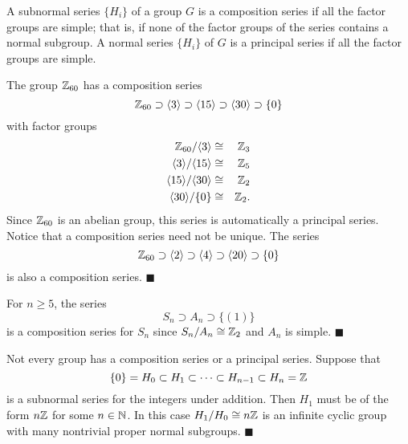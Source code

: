 
\vspace{2ex}
 
 
A subnormal series $\{ H_i \}$ of a group $G$ is a {\bfi composition
series\/} if all the factor groups are 
simple; that is, if none of the factor groups of the series contains a
normal subgroup. A normal series $\{ H_i \}$ of $G$ is a {\bfi 
principal series\/} if all the factor groups 
are simple.  
 
 
\vspace{2ex}
 
 
The group ${\Bbb Z}_{60}$ has  a composition series 
\[
{\Bbb Z}_{60} \supset \langle 3 \rangle \supset  \langle 15 \rangle
\supset \langle 30 \rangle  \supset \{ 0 \}
\]
with factor groups
\begin{eqnarray*}
{\Bbb Z}_{60} / \langle 3 \rangle & \cong & {\Bbb Z}_{3} \\
\langle 3 \rangle / \langle 15 \rangle & \cong & {\Bbb Z}_{5} \\
\langle 15 \rangle / \langle 30 \rangle & \cong & {\Bbb Z}_{2} \\
\langle 30 \rangle / \{ 0 \} & \cong & {\Bbb Z}_2.
\end{eqnarray*}
Since ${\Bbb Z}_{60}$ is an abelian group, this series is
automatically a principal series. Notice that a composition series
need not be unique.  The series 
\[
{\Bbb Z}_{60} \supset \langle 2 \rangle \supset \langle 4 \rangle 
\supset  \langle 20 \rangle \supset \{ 0 \}
\]
is also a composition series.
\hspace{\fill} $\blacksquare$
 
 
\vspace{2ex} 
 
 
For $n \geq 5$, the series
\[
S_n \supset A_n \supset \{ (1) \}
\]
is a composition series for $S_n$ since $S_n / A_n \cong {\Bbb Z}_2$
and $A_n$ is simple.
\hspace{\fill} $\blacksquare$
 
 
\vspace{2ex}
 
 
Not every group has a composition series or a principal series.
Suppose that 
\[
\{ 0 \} = H_0 \subset H_1 \subset \cdots \subset H_{n-1}
\subset H_n = {\Bbb Z}
\]
is a subnormal series for the integers under addition. Then $H_1$ must
be of the form $n {\Bbb Z}$ for some $n \in {\Bbb N}$. In this case
$H_1 / H_0 \cong n {\Bbb Z}$ is an infinite cyclic group with many
nontrivial proper normal subgroups. 
\hspace{\fill} $\blacksquare$
 

